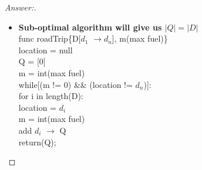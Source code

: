 \documentclass[11pt]{article}
\theoremstyle{definition}
\theoremstyle{definition}
\theoremstyle{definition}
\begin{document}
\begin{proof}[Answer:]
\begin{itemize}
\item \textbf{Sub-optimal algorithm will give us $|Q| = |D|$} \\
func roadTrip\{D[$d_{1}$ $\to$$d_{n}$], m(max fuel)\} \\
\hspace*{2mm} location = null \\
\hspace*{2mm} Q = [0] \\
\hspace*{2mm} m = int(max fuel) \\
\hspace*{2mm} while[(m != 0) \&\& (location != $d_{n}$)]: \\
\hspace*{4mm} for i in length(D): \\
\hspace*{6mm} location = $d_{i}$ \\
\hspace*{6mm} m = int(max fuel) \\
\hspace*{6mm} add $d_{i}$ $\to$ Q \\
return(Q);
\end{itemize}
\end{proof}

\end{document}

